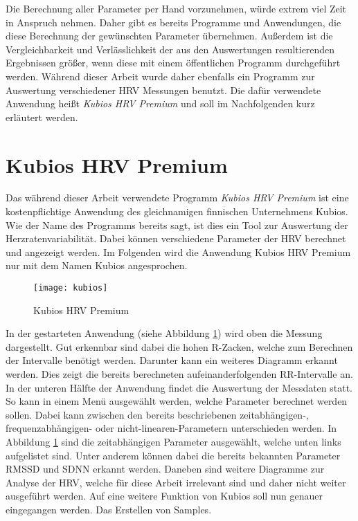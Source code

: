 Die Berechnung aller Parameter per Hand vorzunehmen, würde extrem viel Zeit in Anspruch nehmen. Daher gibt es bereits Programme und Anwendungen, die diese Berechnung der gewünschten Parameter übernehmen. Außerdem ist die Vergleichbarkeit und Verlässlichkeit der aus den Auswertungen resultierenden Ergebnissen größer, wenn diese mit einem öffentlichen Programm durchgeführt werden. Während dieser Arbeit wurde daher ebenfalls ein Programm zur Auswertung verschiedener HRV Messungen benutzt. Die dafür verwendete Anwendung heißt \textit{Kubios HRV Premium} und soll im Nachfolgenden kurz erläutert werden. 

\section{Kubios HRV Premium}
Das während dieser Arbeit verwendete Programm \textit{Kubios HRV Premium} ist eine kostenpflichtige Anwendung des gleichnamigen finnischen Unternehmens Kubios. Wie der Name des Programms bereits sagt, ist dies ein Tool zur Auswertung der Herzratenvariabilität. Dabei können verschiedene Parameter der HRV berechnet und angezeigt werden.
Im Folgenden wird die Anwendung Kubios HRV Premium nur mit dem Namen Kubios angesprochen. 
 \begin{figure}[H]
	\centering
	\texttt{[image: kubios]}
	\caption{Kubios HRV Premium}
	\label{fig:kubios}
\end{figure}

In der gestarteten Anwendung (siehe Abbildung \ref{fig:kubios}) wird oben die Messung dargestellt. Gut erkennbar sind dabei die hohen R-Zacken, welche zum Berechnen der Intervalle benötigt werden. Darunter kann ein weiteres Diagramm erkannt werden. Dies zeigt die bereits berechneten aufeinanderfolgenden RR-Intervalle an. In der unteren Hälfte der Anwendung findet die Auswertung der Messdaten statt. So kann in einem Menü ausgewählt werden, welche Parameter berechnet werden sollen. Dabei kann zwischen den bereits beschriebenen zeitabhängigen-, frequenzabhängigen- oder nicht-linearen-Parametern unterschieden werden. In Abbildung \ref{fig:kubios} sind die zeitabhängigen Parameter ausgewählt, welche unten links aufgelistet sind. Unter anderem können dabei die bereits bekannten Parameter RMSSD und SDNN erkannt werden. Daneben sind weitere Diagramme zur Analyse der HRV, welche für diese Arbeit irrelevant sind und daher nicht weiter ausgeführt werden. Auf eine weitere Funktion von Kubios soll nun genauer eingegangen werden. Das Erstellen von Samples. \\

